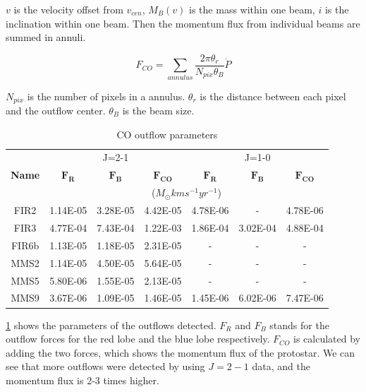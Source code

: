 \documentclass[twoside,11pt]{gshs_thesis}
\begin{document}
$v$ is the velocity offset from $v_{cen}$, $M_B (v)$ is the mass within one beam, $i$ is the inclination within one beam. \cite{Hatchell2}
\newpage
Then the momentum flux from individual beams are summed in annuli. 

\begin{equation}
F_{CO} = \sum _{annulus} \frac{2\pi \theta_r}{N_{pix}\theta_B}\dot{P}	
\end{equation}

$N_{pix}$ is the number of pixels in a annulus. $\theta_r$ is the distance between each pixel and the outflow center. $\theta_B$ is the beam size. \cite{Hatchell2} \cite{Marel}


\begin{table}[h]
	\begin{center}
		\begin{tabular}{c|c|c|c||c|c|c}
			\toprule
			\multirow{3}{1cm}{\textbf{Name}} & \multicolumn{3}{c}{J=2-1} & \multicolumn{3}{c}{J=1-0} \\
			& $\mathbf{F_{R}}$ & $\mathbf{F_{B}}$ & $\mathbf{F_{CO}}$ & $\mathbf{F_{R}}$ & $\mathbf{F_{B}}$ & $\mathbf{F_{CO}}$\\
			& \multicolumn{6}{c}{($M_{\odot} km s^{-1} yr^{-1}$)}\\
			\midrule
			FIR2 & 1.14E-05 & 3.28E-05 & 4.42E-05 & 4.78E-06 & - & 4.78E-06\\
			FIR3 & 4.77E-04 & 7.43E-04 & 1.22E-03 & 1.86E-04 & 3.02E-04 & 4.88E-04\\
			FIR6b & 1.13E-05 & 1.18E-05 & 2.31E-05 & - & - & -\\
			MMS2 & 1.14E-05 & 4.50E-05 & 5.64E-05 & - & - & -\\
			MMS5 & 5.80E-06 & 1.55E-05 & 2.13E-05 & - & - & -\\
			MMS9 & 3.67E-06 & 1.09E-05 & 1.46E-05 & 1.45E-06 & 6.02E-06 & 7.47E-06\\
		\end{tabular}
	\end{center}
	\caption{CO outflow parameters} \label{result}
\end{table}


\noindent\ref{result} shows the parameters of the outflows detected. $F_R$ and $F_B$ stands for the outflow forces for the red lobe and the blue lobe respectively. $F_{CO}$ is calculated by adding the two forces, which shows the momentum flux of the protostar. We can see that more outflows were detected by using $J=2-1$ data, and the momentum flux is 2-3 times higher.\\
\end{document}
